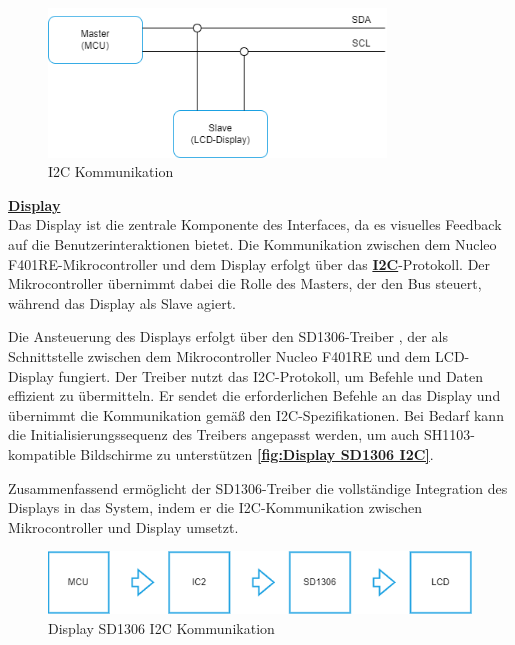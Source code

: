 \begin{figure}[H]
	\centering
	\includegraphics[width=0.8\textwidth]{images/08_durchfuehrung/interface/I2C.drawio.png}
	\caption{I2C Kommunikation}
	\label{fig:I2C}
\end{figure}

\newpage	
\textbf{\hyperlink{Display}{Display}} \\

Das Display ist die zentrale Komponente des Interfaces, da es visuelles Feedback auf die Benutzerinteraktionen bietet. Die Kommunikation zwischen dem Nucleo F401RE-Mikrocontroller und dem Display erfolgt über das \textbf{\hyperlink{I2C_target}{I2C}}-Protokoll. Der Mikrocontroller übernimmt dabei die Rolle des Masters, der den Bus steuert, während das Display als Slave agiert.

Die Ansteuerung des Displays erfolgt über den SD1306-Treiber \cite{sd1306-driver}, der als Schnittstelle zwischen dem Mikrocontroller Nucleo F401RE und dem LCD-Display fungiert. Der Treiber nutzt das I2C-Protokoll, um Befehle und Daten effizient zu übermitteln. Er sendet die erforderlichen Befehle an das Display und übernimmt die Kommunikation gemäß den I2C-Spezifikationen. Bei Bedarf kann die Initialisierungssequenz des Treibers angepasst werden, um auch SH1103-kompatible Bildschirme zu unterstützen \textbf{\autoref{fig:Display SD1306 I2C}}.

Zusammenfassend ermöglicht der SD1306-Treiber die vollständige Integration des Displays in das System, indem er die I2C-Kommunikation zwischen Mikrocontroller und Display umsetzt. \\ 


\begin{figure}[H]
	\centering
	\includegraphics[width=1.0\textwidth]{images/08_durchfuehrung/interface/Display SD1306 Treiber I2C.drawio}
	\caption{Display SD1306 I2C Kommunikation}
	\label{fig:Display SD1306 I2C}
\end{figure}

